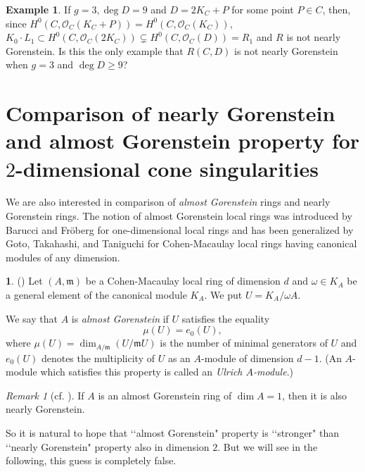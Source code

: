 \documentclass[12pt]{amsart}
\theoremstyle{definition}
\newtheorem{ex}[thm]{Example}
\newtheorem{noname}[thm]{}
\theoremstyle{remark}
\newtheorem{rem}[thm]{Remark}
\numberwithin{equation}{section}
\newcommand{\m}{\mathfrak m}
\newcommand{\cO}{\mathcal O}
\renewcommand{\:}{\colon}
\begin{document}
\begin{ex} If $g=3, \deg D=9$ and $D = 2K_C + P$ for some point 
$P\in C$, 
then, since $H^0(C, \cO_C(K_C+P))= H^0(C,\cO_C(K_C))$, 
$K_0\cdot L_1 \subset H^0(C,\cO_C(2K_C))
\subsetneq H^0(C,\cO_C(D))=R_1$ and $R$ is not nearly Gorenstein. 
Is this the only example that $R(C,D)$ is not  nearly Gorenstein when $g=3$ and $\deg D \ge 9$?    
\end{ex}

\medskip
\section{Comparison of nearly Gorenstein and almost 
Gorenstein property for  $2$-dimensional cone singularities}
\label{s:almost}

We are also interested in comparison of {\em almost Gorenstein} rings and nearly Gorenstein 
rings. 
The notion of almost Gorenstein local rings was introduced by Barucci and Fr\"oberg \cite{BF} for one-dimensional local rings
and  has been generalized by Goto, Takahashi, and Taniguchi \cite{GTT} for Cohen-Macaulay local rings having canonical modules of any dimension. 


\begin{noname}\label{AGdef}(\cite{GTT}) 
Let $(A,\m)$ be a Cohen-Macaulay local ring of dimension $d$
and $\omega  \in K_A$ be a general element of the canonical module $K_A$.  
We put  $U = K_A/ \omega A$. \par
We say that $A$ is {\em almost Gorenstein} if $U$  satisfies the equality
\[
\mu(U) = e_0(U),
\]   
where  $\mu(U) = \dim_{A/\m}( U /\m U)$ is the number of minimal generators of $U$ and 
$e_0(U)$ denotes the multiplicity of $U$ as an $A$-module of dimension $d-1$. (An $A$-module which satisfies this property is called an  {\em Ulrich $A$-module}.)
\end{noname}

\begin{rem}[\textrm{cf. \cite[Proposition 6.1]{HHS}}] 
If $A$ is an almost Gorenstein ring of $\dim A=1$, then it is also nearly Gorenstein. 
\end{rem}

\par 
So it is natural to hope that \lq\lq almost Gorenstein" property is \lq\lq stronger" than 
\lq\lq nearly Gorenstein" property also in dimension $2$. But we will see in the following, 
this guess is completely false.    
\end{document}
